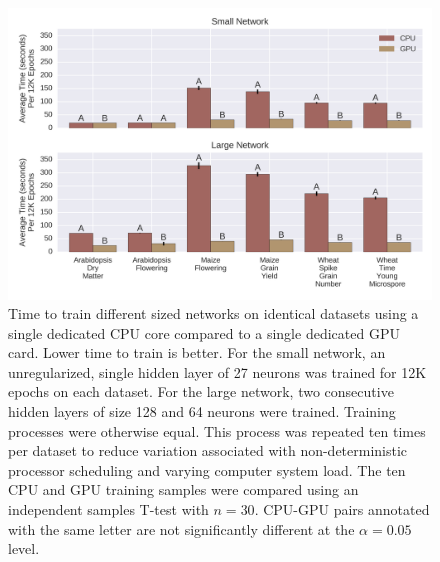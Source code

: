 
\begin{figure}[htbp]
\renewcommand{\familydefault}{\sfdefault}\normalfont
\centering 
\includegraphics[keepaspectratio,width=\linewidth,height=\textheight]{g3_article/figures/time_comparison.png}
    \caption{Time to train different sized networks on identical datasets using a single dedicated CPU core
             compared to a single dedicated GPU card. Lower time to train is better. For the small network, 
             an unregularized, single hidden layer of 27 neurons was trained for 12K epochs on each dataset. 
             For the large network, two consecutive hidden layers of size 128 and 64 neurons were trained. 
             Training processes were otherwise equal. This process was repeated ten times per dataset to 
             reduce variation associated with non-deterministic processor scheduling and varying computer system load.
             The ten CPU and GPU training samples were compared using an independent samples T-test with $n=30$. 
             CPU-GPU pairs annotated with the same letter are not significantly different 
             at the $\alpha=0.05$ level.}
\label{fig:time-comparison}
\end{figure}
